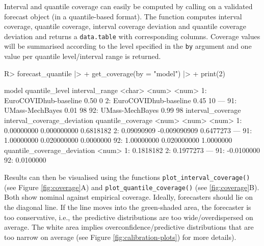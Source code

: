 \documentclass[
]{jss}
\begin{document}
Interval and quantile coverage can easily be computed by calling
 on a validated forecast object (in a
quantile-based format). The function computes interval coverage,
quantile coverage, interval coverage deviation and quantile coverage
deviation and returns a \texttt{data.table} with corresponding columns.
Coverage values will be summarised according to the level specified in
the \texttt{by} argument and one value per quantile level/interval range
is returned.

\begin{CodeChunk}
\begin{CodeInput}
R> forecast_quantile |>
+   get_coverage(by = "model") |>
+   print(2)
\end{CodeInput}
\begin{CodeOutput}
                    model quantile_level interval_range
                   <char>          <num>          <num>
 1: EuroCOVIDhub-baseline           0.50              0
 2: EuroCOVIDhub-baseline           0.45             10
---                                                    
91:       UMass-MechBayes           0.01             98
92:       UMass-MechBayes           0.99             98
    interval_coverage interval_coverage_deviation quantile_coverage
                <num>                       <num>             <num>
 1:        0.00000000                 0.000000000         0.6818182
 2:        0.09090909                -0.009090909         0.6477273
---                                                                
91:        1.00000000                 0.020000000         0.0000000
92:        1.00000000                 0.020000000         1.0000000
    quantile_coverage_deviation
                          <num>
 1:                   0.1818182
 2:                   0.1977273
---                            
91:                  -0.0100000
92:                   0.0100000
\end{CodeOutput}
\end{CodeChunk}

Results can then be visualised using the functions
\texttt{plot\_interval\_coverage()} (see Figure \ref{fig:coverage}A) and
\texttt{plot\_quantile\_coverage()} (see \ref{fig:coverage}B). Both show
nominal against empirical coverage. Ideally, forecasters should lie on
the diagonal line. If the line moves into the green-shaded area, the
forecaster is too conservative, i.e., the predictive distributions are
too wide/overdispersed on average. The white area implies
overconfidence/predictive distributions that are too narrow on average
(see Figure \ref{fig:calibration-plots}) for more details).
\end{document}
